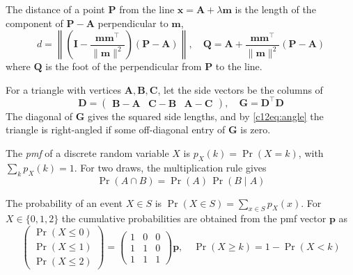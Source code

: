 \item The distance of a point $\mathbf{P}$ from the line $\mathbf{x} = \mathbf{A} + \lambda\mathbf{m}$ is the length of the component of $\mathbf{P}-\mathbf{A}$ perpendicular to $\mathbf{m}$,
\begin{equation}
d = \left\| \left(\mathbf{I} - \frac{\mathbf{m}\mathbf{m}^{\top}}{\|\mathbf{m}\|^{2}}\right)(\mathbf{P}-\mathbf{A}) \right\|, \quad
\mathbf{Q} = \mathbf{A} + \frac{\mathbf{m}\mathbf{m}^{\top}}{\|\mathbf{m}\|^{2}}(\mathbf{P}-\mathbf{A})
\label{c12eq:distline}
\end{equation}
where $\mathbf{Q}$ is the foot of the perpendicular from $\mathbf{P}$ to the line.

\item For a triangle with vertices $\mathbf{A},\mathbf{B},\mathbf{C}$, let the side vectors be the columns of
\begin{equation}
\mathbf{D} = \begin{pmatrix} \mathbf{B}-\mathbf{A} & \mathbf{C}-\mathbf{B} & \mathbf{A}-\mathbf{C} \end{pmatrix}, \quad
\mathbf{G} = \mathbf{D}^{\top}\mathbf{D}
\label{c12eq:gram}
\end{equation}
The diagonal of $\mathbf{G}$ gives the squared side lengths, and by \eqref{c12eq:angle} the triangle is right-angled if some off-diagonal entry of $\mathbf{G}$ is zero.

\item The \emph{pmf} of a discrete random variable $X$ is $p_X(k) = \Pr(X = k)$, with $\sum_k p_X(k) = 1$. For two draws, the multiplication rule gives
\begin{equation}
\Pr(A \cap B) = \Pr(A)\,\Pr(B \mid A)
\label{c12eq:mult}
\end{equation}

\item The probability of an event $X \in S$ is $\Pr(X \in S) = \sum_{x \in S} p_X(x)$. For $X \in \{0,1,2\}$ the cumulative probabilities are obtained from the pmf vector $\mathbf{p}$ as
\begin{equation}
\begin{pmatrix} \Pr(X \le 0) \\ \Pr(X \le 1) \\ \Pr(X \le 2) \end{pmatrix}
= \begin{pmatrix} 1 & 0 & 0 \\ 1 & 1 & 0 \\ 1 & 1 & 1 \end{pmatrix}\mathbf{p}, \quad
\Pr(X \ge k) = 1 - \Pr(X < k)
\label{c12eq:cdf}
\end{equation}

